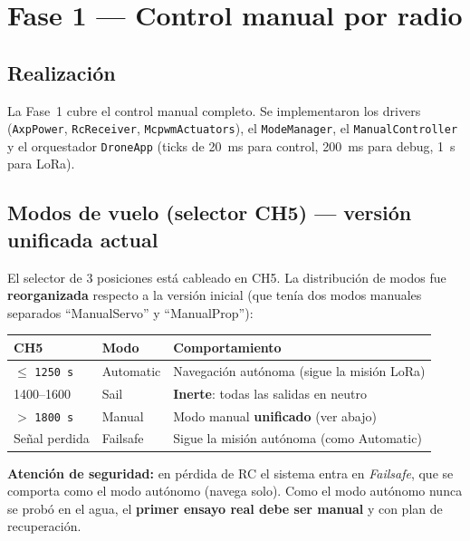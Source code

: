 \documentclass[12pt,a4paper]{article}
\newcommand{\us}[1]{\texttt{#1\,\textmu s}}
\newcommand{\file}[1]{\texttt{#1}}
\begin{document}
\section{Fase 1 --- Control manual por radio}

\subsection{Realizaci\'on}

La Fase~1 cubre el control manual completo. Se implementaron los drivers
(\file{AxpPower}, \file{RcReceiver}, \file{McpwmActuators}), el \file{ModeManager},
el \file{ManualController} y el orquestador \file{DroneApp} (ticks de 20~ms para
control, 200~ms para debug, 1~s para LoRa).

\subsection{Modos de vuelo (selector CH5) --- versi\'on unificada actual}

El selector de 3 posiciones est\'a cableado en CH5. La distribuci\'on de modos fue
\textbf{reorganizada} respecto a la versi\'on inicial (que ten\'ia dos modos
manuales separados ``ManualServo'' y ``ManualProp''):

\begin{longtable}{C{2.6cm} C{2.4cm} L{8cm}}
  \toprule
  \textcolor{tableheadfg}{\textbf{CH5}} &
  \textcolor{tableheadfg}{\textbf{Modo}} &
  \textcolor{tableheadfg}{\textbf{Comportamiento}} \\
  \midrule
  \endhead
  \bottomrule
  \endfoot
  $\leq$ \us{1250} & Automatic & Navegaci\'on aut\'onoma (sigue la misi\'on LoRa) \\[3pt]
  1400--1600 & Sail & \textbf{Inerte}: todas las salidas en neutro \\[3pt]
  $>$ \us{1800} & Manual & Modo manual \textbf{unificado} (ver abajo) \\[3pt]
  Se\~nal perdida & Failsafe & Sigue la misi\'on aut\'onoma (como Automatic) \\
\end{longtable}

\begin{warningbox}
  \textbf{Atenci\'on de seguridad:} en p\'erdida de RC el sistema entra en
  \emph{Failsafe}, que se comporta como el modo aut\'onomo (navega solo). Como el
  modo aut\'onomo nunca se prob\'o en el agua, el \textbf{primer ensayo real debe
  ser manual} y con plan de recuperaci\'on.
\end{warningbox}
\end{document}
